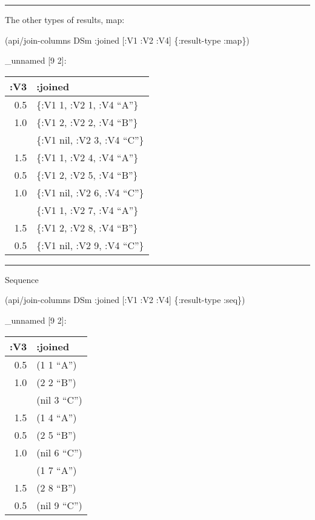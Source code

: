 \documentclass[]{article}
\newenvironment{Shaded}{\begin{snugshade}}{\end{snugshade}}
\newcommand{\AttributeTok}[1]{\textcolor[rgb]{0.77,0.63,0.00}{#1}}
\newcommand{\NormalTok}[1]{#1}
\begin{document}
\begin{center}\rule{0.5\linewidth}{0.5pt}\end{center}

The other types of results, map:

\begin{Shaded}
\begin{Highlighting}[]
\NormalTok{(api/join-columns DSm }\AttributeTok{:joined}\NormalTok{ [}\AttributeTok{:V1} \AttributeTok{:V2} \AttributeTok{:V4}\NormalTok{] \{}\AttributeTok{:result-type} \AttributeTok{:map}\NormalTok{\})}
\end{Highlighting}
\end{Shaded}

\_unnamed {[}9 2{]}:

\begin{longtable}[]{@{}rl@{}}
\toprule
:V3 & :joined\tabularnewline
\midrule
\endhead
0.5 & \{:V1 1, :V2 1, :V4 ``A''\}\tabularnewline
1.0 & \{:V1 2, :V2 2, :V4 ``B''\}\tabularnewline
& \{:V1 nil, :V2 3, :V4 ``C''\}\tabularnewline
1.5 & \{:V1 1, :V2 4, :V4 ``A''\}\tabularnewline
0.5 & \{:V1 2, :V2 5, :V4 ``B''\}\tabularnewline
1.0 & \{:V1 nil, :V2 6, :V4 ``C''\}\tabularnewline
& \{:V1 1, :V2 7, :V4 ``A''\}\tabularnewline
1.5 & \{:V1 2, :V2 8, :V4 ``B''\}\tabularnewline
0.5 & \{:V1 nil, :V2 9, :V4 ``C''\}\tabularnewline
\bottomrule
\end{longtable}

\begin{center}\rule{0.5\linewidth}{0.5pt}\end{center}

Sequence

\begin{Shaded}
\begin{Highlighting}[]
\NormalTok{(api/join-columns DSm }\AttributeTok{:joined}\NormalTok{ [}\AttributeTok{:V1} \AttributeTok{:V2} \AttributeTok{:V4}\NormalTok{] \{}\AttributeTok{:result-type} \AttributeTok{:seq}\NormalTok{\})}
\end{Highlighting}
\end{Shaded}

\_unnamed {[}9 2{]}:

\begin{longtable}[]{@{}rl@{}}
\toprule
:V3 & :joined\tabularnewline
\midrule
\endhead
0.5 & (1 1 ``A'')\tabularnewline
1.0 & (2 2 ``B'')\tabularnewline
& (nil 3 ``C'')\tabularnewline
1.5 & (1 4 ``A'')\tabularnewline
0.5 & (2 5 ``B'')\tabularnewline
1.0 & (nil 6 ``C'')\tabularnewline
& (1 7 ``A'')\tabularnewline
1.5 & (2 8 ``B'')\tabularnewline
0.5 & (nil 9 ``C'')\tabularnewline
\bottomrule
\end{longtable}
\end{document}
